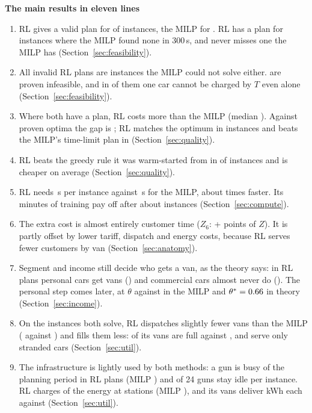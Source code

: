 \begin{keybox}
{\color{headblue}\textbf{The main results in eleven lines}}
\begin{enumerate}[leftmargin=1.4em,itemsep=1pt]
  \item RL gives a valid plan for \NValid{} of \NInst{} instances, the MILP for \NValidM. RL has a plan for \RLonly{} instances where the MILP found none in 300\,s, and never misses one the MILP has (Section~\ref{sec:feasibility}).
  \item All \NInvalid{} invalid RL plans are instances the MILP could not solve either. \InvalidInf{} are proven infeasible, and in \InvLone{} of them one car cannot be charged by $T$ even alone (Section~\ref{sec:feasibility}).
  \item Where both have a plan, RL costs \GapMean\pct{} more than the MILP (median \GapMed\pct). Against proven optima the gap is \GapOpt\pct; RL matches the optimum in \RLequalOpt{} instances and beats the MILP's time-limit plan in \RLbetter{} (Section~\ref{sec:quality}).
  \item RL beats the greedy rule it was warm-started from in \GreedyBeat{} of \GreedyN{} instances and is \GreedyGapAbs\pct{} cheaper on average (Section~\ref{sec:quality}).
  \item RL needs \RLtime\,s per instance against \MILPtime\,s for the MILP, about \Speedup{} times faster. Its \TrainMinBest{} minutes of training pay off after about \BreakEven{} instances (Section~\ref{sec:compute}).
  \item The extra cost is almost entirely customer time ($Z_6$: +\TermDSix{} points of $Z$). It is partly offset by lower tariff, dispatch and energy costs, because RL serves fewer customers by van (Section~\ref{sec:anatomy}).
  \item Segment and income still decide who gets a van, as the theory says: in RL plans personal cars get vans (\VanRPers\pct) and commercial cars almost never do (\VanRComm\pct). The personal step comes later, at $\theta$ \StepR{} against \StepM{} in the MILP and $\theta^{*}=0.66$ in theory (Section~\ref{sec:income}).
  \item On the instances both solve, RL dispatches slightly fewer vans than the MILP (\VansR{} against \VansM) and fills them less: \VansFullR\pct{} of its vans are full against \VansFullM\pct, and \OnlyStrandedR\pct{} serve only stranded cars (Section~\ref{sec:util}).
  \item The infrastructure is lightly used by both methods: a gun is busy \UtilGunR\pct{} of the planning period in RL plans (MILP \UtilGunM\pct) and \UtilIdleGunsR{} of 24 guns stay idle per instance. RL charges \UtilFcsShareR\pct{} of the energy at stations (MILP \UtilFcsShareM\pct), and its vans deliver \UtilVanKwhR{} kWh each against \UtilVanKwhM{} (Section~\ref{sec:util}).

\end{enumerate}
\end{keybox}
